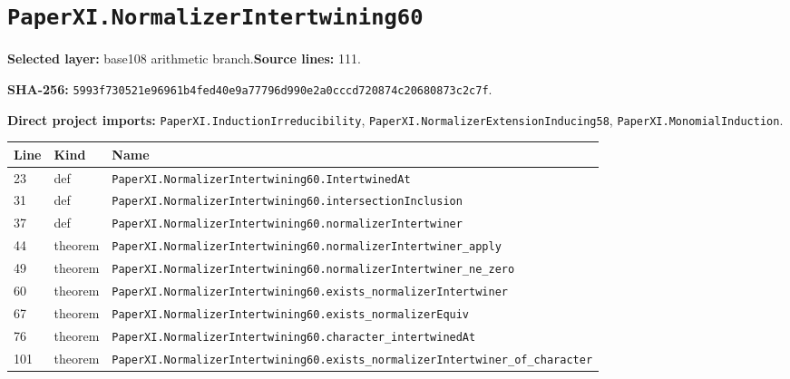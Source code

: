 \documentclass[10pt,oneside]{book}
\begin{document}
\section{\texorpdfstring{\nolinkurl{PaperXI.NormalizerIntertwining60}}{PaperXI.NormalizerIntertwining60}}\label{module:PaperXI.NormalizerIntertwining60}

\textbf{Selected layer:} base108 arithmetic branch.\quad\textbf{Source lines:} 111.\par\textbf{SHA-256:} {\scriptsize\nolinkurl{5993f730521e96961b4fed40e9a77796d990e2a0cccd720874c20680873c2c7f}}.


\textbf{Direct project imports:} \nolinkurl{PaperXI.InductionIrreducibility}, \nolinkurl{PaperXI.NormalizerExtensionInducing58}, \nolinkurl{PaperXI.MonomialInduction}.

\begin{longtable}{@{}p{}p{}p{}@{}}\toprule Line&Kind&Name\\\midrule\endhead

23&def&\nolinkurl{PaperXI.NormalizerIntertwining60.IntertwinedAt}\\

31&def&\nolinkurl{PaperXI.NormalizerIntertwining60.intersectionInclusion}\\

37&def&\nolinkurl{PaperXI.NormalizerIntertwining60.normalizerIntertwiner}\\

44&theorem&\nolinkurl{PaperXI.NormalizerIntertwining60.normalizerIntertwiner_apply}\\

49&theorem&\nolinkurl{PaperXI.NormalizerIntertwining60.normalizerIntertwiner_ne_zero}\\

60&theorem&\nolinkurl{PaperXI.NormalizerIntertwining60.exists_normalizerIntertwiner}\\

67&theorem&\nolinkurl{PaperXI.NormalizerIntertwining60.exists_normalizerEquiv}\\

76&theorem&\nolinkurl{PaperXI.NormalizerIntertwining60.character_intertwinedAt}\\

101&theorem&\nolinkurl{PaperXI.NormalizerIntertwining60.exists_normalizerIntertwiner_of_character}\\

\bottomrule\end{longtable}
\end{document}
